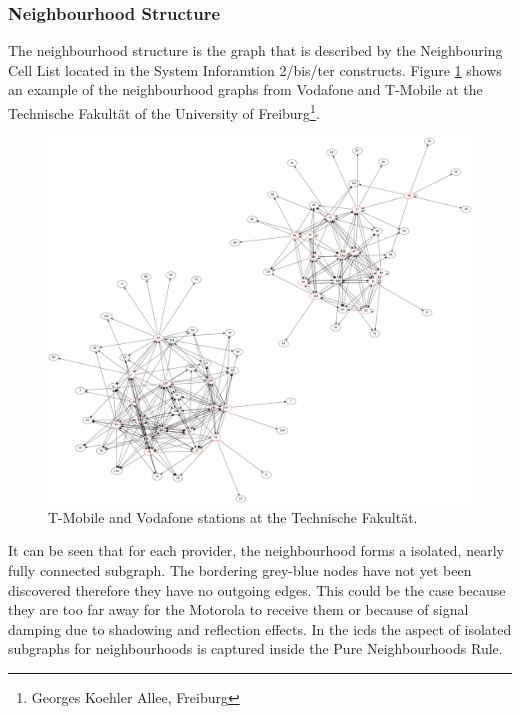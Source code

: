 \subsubsection{Neighbourhood Structure}
The neighbourhood structure is the graph that is described by the Neighbouring Cell List located in the System Inforamtion 2/bis/ter constructs.
Figure \ref{fig:neighbourhood_example} shows an example of the neighbourhood graphs from Vodafone and T-Mobile at the Technische Fakult\"at of the University of Freiburg\footnote{Georges Koehler Allee, Freiburg}.
\begin{figure}
\centering
\includegraphics[width=.9\textwidth]{../Images/neighbourhoods_fak}
\caption{T-Mobile and Vodafone stations at the Technische Fakult\"at.}
\label{fig:neighbourhood_example}
\end{figure}
It can be seen that for each provider, the neighbourhood forms a isolated, nearly fully connected subgraph.
The bordering grey-blue nodes have not yet been discovered therefore they have no outgoing edges.
This could be the case because they are too far away for the Motorola to receive them or because of signal damping due to shadowing and reflection effects.
In the \gls{icds} the aspect of isolated subgraphs for neighbourhoods is captured inside the Pure Neighbourhoods Rule.

